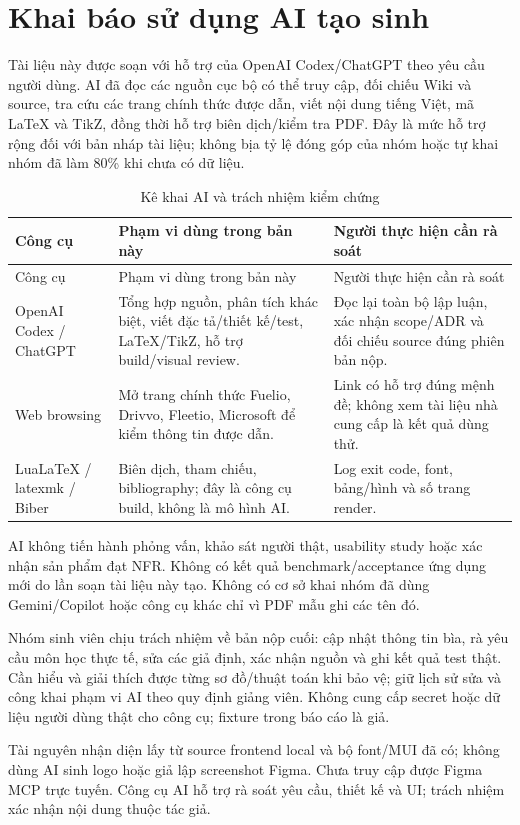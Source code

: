 \chapter{Khai báo sử dụng AI tạo sinh}\label{chap:ai}
Tài liệu này được soạn với hỗ trợ của OpenAI Codex/ChatGPT theo yêu cầu người dùng. AI đã đọc các nguồn cục bộ có thể truy cập, đối chiếu Wiki và source, tra cứu các trang chính thức được dẫn, viết nội dung tiếng Việt, mã LaTeX và TikZ, đồng thời hỗ trợ biên dịch/kiểm tra PDF. Đây là mức hỗ trợ rộng đối với bản nháp tài liệu; không bịa tỷ lệ đóng góp của nhóm hoặc tự khai nhóm đã làm 80\% khi chưa có dữ liệu.
\begin{smalltable}\begin{longtable}{L{3cm}L{6.2cm}L{5.3cm}}
\caption{Kê khai AI và trách nhiệm kiểm chứng}\\\toprule Công cụ & Phạm vi dùng trong bản này & Người thực hiện cần rà soát\\\midrule\endfirsthead
\toprule Công cụ & Phạm vi dùng trong bản này & Người thực hiện cần rà soát\\\midrule\endhead
OpenAI Codex / ChatGPT & Tổng hợp nguồn, phân tích khác biệt, viết đặc tả/thiết kế/test, LaTeX/TikZ, hỗ trợ build/visual review. & Đọc lại toàn bộ lập luận, xác nhận scope/ADR và đối chiếu source đúng phiên bản nộp.\\
Web browsing & Mở trang chính thức Fuelio, Drivvo, Fleetio, Microsoft để kiểm thông tin được dẫn. & Link có hỗ trợ đúng mệnh đề; không xem tài liệu nhà cung cấp là kết quả dùng thử.\\
LuaLaTeX / latexmk / Biber & Biên dịch, tham chiếu, bibliography; đây là công cụ build, không là mô hình AI. & Log exit code, font, bảng/hình và số trang render.\\\bottomrule
\end{longtable}\end{smalltable}
AI không tiến hành phỏng vấn, khảo sát người thật, usability study hoặc xác nhận sản phẩm đạt NFR. Không có kết quả benchmark/acceptance ứng dụng mới do lần soạn tài liệu này tạo. Không có cơ sở khai nhóm đã dùng Gemini/Copilot hoặc công cụ khác chỉ vì PDF mẫu ghi các tên đó.

Nhóm sinh viên chịu trách nhiệm về bản nộp cuối: cập nhật thông tin bìa, rà yêu cầu môn học thực tế, sửa các giả định, xác nhận nguồn và ghi kết quả test thật. Cần hiểu và giải thích được từng sơ đồ/thuật toán khi bảo vệ; giữ lịch sử sửa và công khai phạm vi AI theo quy định giảng viên. Không cung cấp secret hoặc dữ liệu người dùng thật cho công cụ; fixture trong báo cáo là giả.

Tài nguyên nhận diện lấy từ source frontend local và bộ font/MUI đã có; không dùng AI sinh logo hoặc giả lập screenshot Figma. Chưa truy cập được Figma MCP trực tuyến. Công cụ AI hỗ trợ rà soát yêu cầu, thiết kế và UI; trách nhiệm xác nhận nội dung thuộc tác giả.
